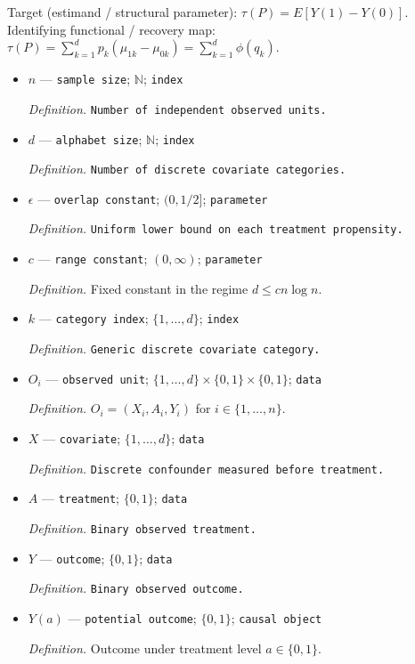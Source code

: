 \documentclass{article}
\begin{document}
Target (estimand / structural parameter): \(\tau(P)=E[Y(1)-Y(0)]\).
Identifying functional / recovery map: \(\tau(P)=\sum_{k=1}^{d}p_k(\mu_{1k}-\mu_{0k})=\sum_{k=1}^{d}\phi(q_k)\).
\begin{itemize}
  \item \(n\) --- \texttt{sample size}; \(\mathbb N\); \texttt{index}
  \par\smallskip\noindent\emph{Definition.} \texttt{Number of independent observed units.}
  \item \(d\) --- \texttt{alphabet size}; \(\mathbb N\); \texttt{index}
  \par\smallskip\noindent\emph{Definition.} \texttt{Number of discrete covariate categories.}
  \item \(\epsilon\) --- \texttt{overlap constant}; \((0,1/2]\); \texttt{parameter}
  \par\smallskip\noindent\emph{Definition.} \texttt{Uniform lower bound on each treatment propensity.}
  \item \(c\) --- \texttt{range constant}; \((0,\infty)\); \texttt{parameter}
  \par\smallskip\noindent\emph{Definition.} Fixed constant in the regime \(d\le c n\log n\).
  \item \(k\) --- \texttt{category index}; \(\{1,\ldots,d\}\); \texttt{index}
  \par\smallskip\noindent\emph{Definition.} \texttt{Generic discrete covariate category.}
  \item \(O_i\) --- \texttt{observed unit}; \(\{1,\ldots,d\}\times\{0,1\}\times\{0,1\}\); \texttt{data}
  \par\smallskip\noindent\emph{Definition.} \(O_i=(X_i,A_i,Y_i)\) for \(i\in\{1,\ldots,n\}\).
  \item \(X\) --- \texttt{covariate}; \(\{1,\ldots,d\}\); \texttt{data}
  \par\smallskip\noindent\emph{Definition.} \texttt{Discrete confounder measured before treatment.}
  \item \(A\) --- \texttt{treatment}; \(\{0,1\}\); \texttt{data}
  \par\smallskip\noindent\emph{Definition.} \texttt{Binary observed treatment.}
  \item \(Y\) --- \texttt{outcome}; \(\{0,1\}\); \texttt{data}
  \par\smallskip\noindent\emph{Definition.} \texttt{Binary observed outcome.}
  \item \(Y(a)\) --- \texttt{potential outcome}; \(\{0,1\}\); \texttt{causal object}
  \par\smallskip\noindent\emph{Definition.} Outcome under treatment level \(a\in\{0,1\}\).

\end{itemize}
\end{document}
